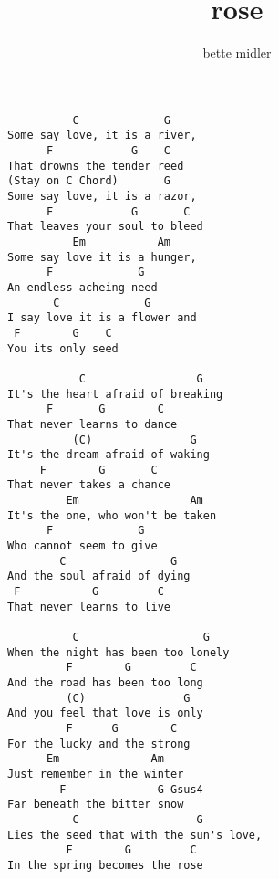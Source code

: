 \author{bette midler}
\title{rose}
\maketitle
\begin{verbatim}
          C             G
Some say love, it is a river,
      F            G    C
That drowns the tender reed
(Stay on C Chord)       G
Some say love, it is a razor,
      F            G       C
That leaves your soul to bleed
          Em           Am
Some say love it is a hunger,
      F             G
An endless acheing need
       C             G
I say love it is a flower and
 F        G    C
You its only seed

           C                 G
It's the heart afraid of breaking
      F       G        C
That never learns to dance
          (C)               G
It's the dream afraid of waking
     F        G       C
That never takes a chance
         Em                 Am
It's the one, who won't be taken
      F             G
Who cannot seem to give
        C                G
And the soul afraid of dying
 F           G         C
That never learns to live

          C                   G
When the night has been too lonely
         F        G         C
And the road has been too long
         (C)               G
And you feel that love is only
         F      G        C
For the lucky and the strong
      Em              Am
Just remember in the winter
        F              G-Gsus4
Far beneath the bitter snow
          C                  G
Lies the seed that with the sun's love,
         F        G         C
In the spring becomes the rose
\end{verbatim}